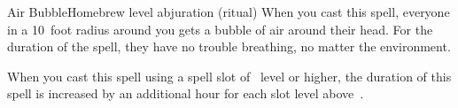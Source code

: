 \begin{spell}{Air Bubble}{Homebrew}{ level abjuration (ritual)}
{
}
When you cast this spell, everyone in a 10~foot radius
around you gets a bubble of air around their head. For the
duration of the spell, they have no trouble breathing, no
matter the environment.

 When you cast this spell using a
spell slot of ~level or higher, the duration of this
spell is increased by an additional hour for each slot
level above~.
\end{spell}
